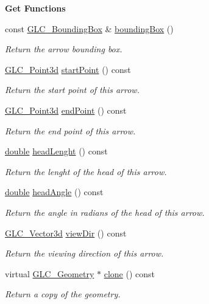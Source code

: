 \begin{Indent}{\bf Get Functions}\par
\begin{DoxyCompactItemize}
\item 
const \hyperlink{class_g_l_c___bounding_box}{G\-L\-C\-\_\-\-Bounding\-Box} \& \hyperlink{class_g_l_c___arrow_a17c39eecdad1f48a99a998d21d8ff152}{bounding\-Box} ()
\begin{DoxyCompactList}\small\item\em Return the arrow bounding box. \end{DoxyCompactList}\item 
\hyperlink{glc__vector3d_8h_a4e13a9bbc7ab3d34de7e98b41836772c}{G\-L\-C\-\_\-\-Point3d} \hyperlink{class_g_l_c___arrow_a6d2bcdd639b9ada7f6c2609ef3c2d6d2}{start\-Point} () const 
\begin{DoxyCompactList}\small\item\em Return the start point of this arrow. \end{DoxyCompactList}\item 
\hyperlink{glc__vector3d_8h_a4e13a9bbc7ab3d34de7e98b41836772c}{G\-L\-C\-\_\-\-Point3d} \hyperlink{class_g_l_c___arrow_af850396d971329d424a9ce1c9efe37dd}{end\-Point} () const 
\begin{DoxyCompactList}\small\item\em Return the end point of this arrow. \end{DoxyCompactList}\item 
\hyperlink{_super_l_u_support_8h_a8956b2b9f49bf918deed98379d159ca7}{double} \hyperlink{class_g_l_c___arrow_ab96db90473454391c06179eb7713a19b}{head\-Lenght} () const 
\begin{DoxyCompactList}\small\item\em Return the lenght of the head of this arrow. \end{DoxyCompactList}\item 
\hyperlink{_super_l_u_support_8h_a8956b2b9f49bf918deed98379d159ca7}{double} \hyperlink{class_g_l_c___arrow_a9cfaf08a4856518903b9ed5fe500d127}{head\-Angle} () const 
\begin{DoxyCompactList}\small\item\em Return the angle in radians of the head of this arrow. \end{DoxyCompactList}\item 
\hyperlink{class_g_l_c___vector3d}{G\-L\-C\-\_\-\-Vector3d} \hyperlink{class_g_l_c___arrow_a2af2b7178bde1936447fc78dbcea3b4f}{view\-Dir} () const 
\begin{DoxyCompactList}\small\item\em Return the viewing direction of this arrow. \end{DoxyCompactList}\item 
virtual \hyperlink{class_g_l_c___geometry}{G\-L\-C\-\_\-\-Geometry} $\ast$ \hyperlink{class_g_l_c___arrow_a33b456375ad6fc6e0ced4ff4d5cdaac8}{clone} () const 
\begin{DoxyCompactList}\small\item\em Return a copy of the geometry. \end{DoxyCompactList}\end{DoxyCompactItemize}
\end{Indent}

